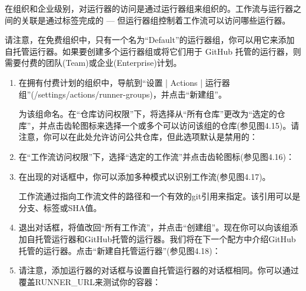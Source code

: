 在组织和企业级别，对运行器的访问是通过运行器组来组织的。工作流与运行器之间的关联是通过标签完成的 --- 但运行器组控制着工作流可以访问哪些运行器。


请注意，在免费组织中，只有一个名为“Default”的运行器组，你可以用它来添加自托管运行器。如果要创建多个运行器组或将它们用于 GitHub 托管的运行器，则需要付费的团队(Team)或企业(Enterprise)计划。


\begin{enumerate}
\item 
在拥有付费计划的组织中，导航到“设置 | Actions | 运行器组”(/settings/actions/runner-groups)，并点击“新建组”。

为该组命名。在“仓库访问权限”下，将选择从“所有仓库”更改为“选定的仓库”，并点击齿轮图标来选择一个或多个可以访问该组的仓库(参见图4.15)。请注意，你可以在此处允许访问公共仓库，但此选项默认是禁用的：


\item 
在“工作流访问权限”下，选择“选定的工作流”并点击齿轮图标(参见图4.16)：


\item 
在出现的对话框中，你可以添加多种模式以识别工作流(参见图4.17)。


工作流通过指向工作流文件的路径和一个有效的git引用来指定。该引用可以是分支、标签或SHA值。

\item 
退出对话框，将值改回“所有工作流”，并点击“创建组”。现在你可以向该组添加自托管运行器和GitHub托管的运行器。我们将在下一个配方中介绍GitHub托管的运行器。点击“新建自托管运行器”(参见图4.18)：


\item 
请注意，添加运行器的对话框与设置自托管运行器的对话框相同。你可以通过覆盖RUNNER\_URL来测试你的容器：



\end{enumerate}
